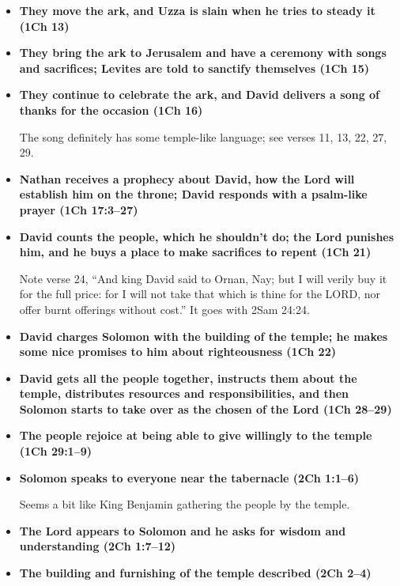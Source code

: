 \begin{itemize}
\item \textbf{They move the ark, and Uzza is slain when he tries to steady it (1Ch 13)}

\item \textbf{They bring the ark to Jerusalem and have a ceremony with songs and sacrifices; Levites are told to sanctify themselves (1Ch 15)}

\item \textbf{They continue to celebrate the ark, and David delivers a song of thanks for the occasion (1Ch 16)}

	The song definitely has some temple-like language; see verses 11, 13, 22, 27, 29.
	
\item \textbf{Nathan receives a prophecy about David, how the Lord will establish him on the throne; David responds with a psalm-like prayer (1Ch 17:3--27)}

\item \textbf{David counts the people, which he shouldn't do; the Lord punishes him, and he buys a place to make sacrifices to repent (1Ch 21)}

	Note verse 24, ``And king David said to Ornan, Nay; but I will verily buy it for the full price: for I will not take that which is thine for the LORD, nor offer burnt offerings without cost.'' It goes with 2Sam 24:24.
	
\item \textbf{David charges Solomon with the building of the temple; he makes some nice promises to him about righteousness (1Ch 22)}

\item \textbf{David gets all the people together, instructs them about the temple, distributes resources and responsibilities, and then Solomon starts to take over as the chosen of the Lord (1Ch 28--29)}

\item \textbf{The people rejoice at being able to give willingly to the temple (1Ch 29:1--9)}

\item \textbf{Solomon speaks to everyone near the tabernacle (2Ch 1:1--6)}

	Seems a bit like King Benjamin gathering the people by the temple.
	
\item \textbf{The Lord appears to Solomon and he asks for wisdom and understanding (2Ch 1:7--12)}

\item \textbf{The building and furnishing of the temple described (2Ch 2--4)}


\end{itemize}
